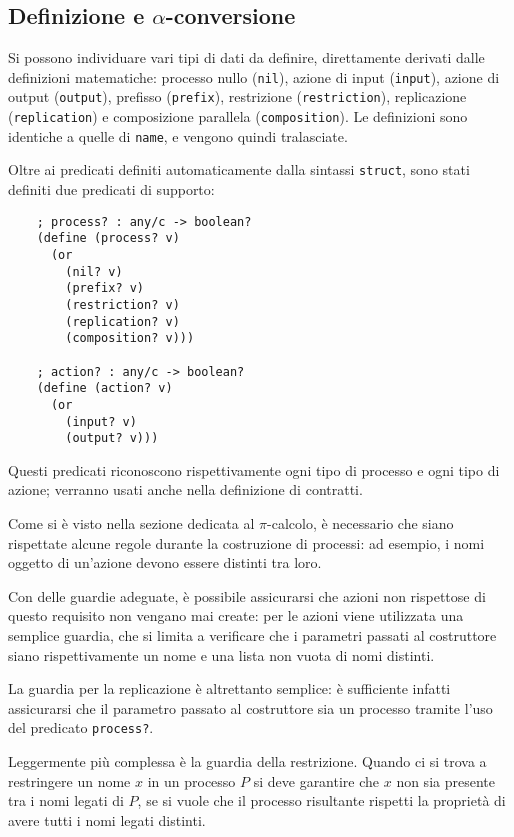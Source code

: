 \subsection{Definizione e \texorpdfstring{$\alpha$}{alfa}-conversione}

Si possono individuare vari tipi di dati da definire, direttamente derivati
dalle definizioni matematiche: processo nullo (\lstinline{nil}), azione di
input (\lstinline{input}), azione di output (\lstinline{output}), prefisso
(\lstinline{prefix}), restrizione (\lstinline{restriction}), replicazione
(\lstinline{replication}) e composizione parallela (\lstinline{composition}).
Le definizioni sono identiche a quelle di \lstinline{name}, e vengono quindi
tralasciate.

Oltre ai predicati definiti automaticamente dalla sintassi
\lstinline{struct}, sono stati definiti due predicati di supporto:

\begin{lstlisting}
    ; process? : any/c -> boolean?
    (define (process? v)
      (or
        (nil? v)
        (prefix? v)
        (restriction? v)
        (replication? v)
        (composition? v)))

    ; action? : any/c -> boolean?
    (define (action? v)
      (or
        (input? v)
        (output? v)))

\end{lstlisting}

Questi predicati riconoscono rispettivamente ogni tipo di processo e ogni
tipo di azione; verranno usati anche nella definizione di contratti.

Come si \`e visto nella sezione dedicata al $\pi$-calcolo, \`e necessario
che siano rispettate alcune regole durante la costruzione di processi: ad
esempio, i nomi oggetto di un'azione devono essere distinti tra loro.

Con delle guardie adeguate, \`e possibile assicurarsi che azioni non
rispettose di questo requisito non vengano mai create: per le azioni viene
utilizzata una semplice guardia, che si limita a verificare che i parametri
passati al costruttore siano rispettivamente un nome e una lista non vuota
di nomi distinti.

La guardia per la replicazione \`e altrettanto semplice: \`e sufficiente
infatti assicurarsi che il parametro passato al costruttore sia un processo
tramite l'uso del predicato \lstinline{process?}.

Leggermente pi\`u complessa \`e la guardia della restrizione. Quando ci si
trova a restringere un nome $x$ in un processo $P$ si deve garantire che
$x$ non sia presente tra i nomi legati di $P$, se si vuole che il processo
risultante rispetti la propriet\`a di avere tutti i nomi legati distinti.

